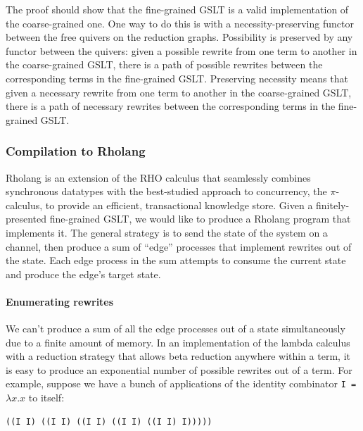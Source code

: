 \documentclass{article}
\begin{document}
The proof should show that the fine-grained GSLT is a valid implementation of the coarse-grained one.  One way to do this is with a necessity-preserving functor between the free quivers on the reduction graphs.  Possibility is preserved by any functor between the quivers: given a possible rewrite from one term to another in the coarse-grained GSLT, there is a path of possible rewrites between the corresponding terms in the fine-grained GSLT.  Preserving necessity means that given a necessary rewrite from one term to another in the coarse-grained GSLT, there is a path of necessary rewrites between the corresponding terms in the fine-grained GSLT.

\subsubsection{Compilation to Rholang}
\label{comp_to_rholang}

Rholang is an extension of the RHO calculus that seamlessly combines synchronous datatypes with the best-studied approach to concurrency, the $\pi$-calculus, to provide an efficient, transactional knowledge store.  Given a finitely-presented fine-grained GSLT, we would like to produce a Rholang program that implements it.  The general strategy is to send the state of the system on a channel, then produce a sum of ``edge'' processes that implement rewrites out of the state.  Each edge process in the sum attempts to consume the current state and produce the edge's target state.


\paragraph{Enumerating rewrites}
\label{enum_rewrites}

We can't produce a sum of all the edge processes out of a state simultaneously due to a finite amount of memory.  In an implementation of the lambda calculus with a reduction strategy that allows beta reduction anywhere within a term, it is easy to produce an exponential number of possible rewrites out of a term.  For example, suppose we have a bunch of applications of the identity combinator \verb+I = +$\lambda x.x$ to itself:

\begin{verbatim}
((I I) ((I I) ((I I) ((I I) ((I I) I)))))
\end{verbatim}
\end{document}
